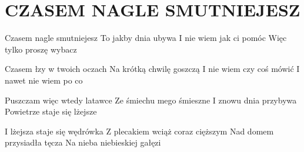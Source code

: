 \documentclass[../../../songbook.tex]{subfiles}
\begin{document}
\TabPositions{8cm} %
\section*{CZASEM NAGLE SMUTNIEJESZ}
{}
\vspace{0.5cm}
Czasem nagle smutniejesz 		 \newline
To jakby dnia ubywa 			 \newline
I nie wiem jak ci pomóc 		 \newline
Więc tylko proszę wybacz 		 \newline

\-\hspace{1cm} Czasem łzy w twoich oczach 	 \newline
\-\hspace{1cm} Na krótką chwilę goszczą 	 \newline
\-\hspace{1cm} I nie wiem czy coś mówić		 \newline
\-\hspace{1cm} I nawet nie wiem po co 		  \newline

Puszczam więc wtedy latawce \newline
Ze śmiechu mego śmieszne \newline
I znowu dnia przybywa \newline
Powietrze staje się lżejsze \newline

\-\hspace{1cm} I lżejsza staje się wędrówka \newline
\-\hspace{1cm} Z plecakiem wciąż coraz cięższym \newline
\-\hspace{1cm} Nad domem przysiadła tęcza \newline
\-\hspace{1cm} Na nieba niebieskiej gałęzi \newline
\end{document}
